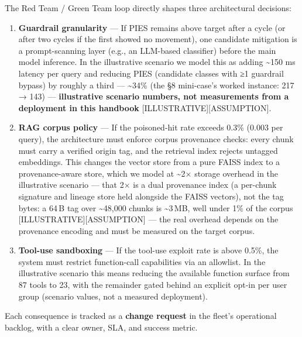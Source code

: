 \label{architecture-consequence}


The Red Team / Green Team loop directly shapes three architectural
decisions:

\begin{enumerate}
\def\labelenumi{\arabic{enumi}.}
\item
  \textbf{Guardrail granularity} --- If PIES remains above target after
  a cycle (or after two cycles if the first showed no movement), one
  candidate mitigation is a prompt-scanning layer (e.g., an LLM-based
  classifier) before the main model inference. In the illustrative
  scenario we model this as adding \textasciitilde150 ms latency per
  query and reducing PIES (candidate classes with ≥1 guardrail bypass)
  by roughly a third --- \textasciitilde34\% (the §8 mini-case's worked
  instance: 217 → 143) --- \textbf{illustrative scenario numbers, not
  measurements from a deployment in this handbook}
  \mbox{{[}ILLUSTRATIVE{]}}\hspace{0pt}\mbox{{[}ASSUMPTION{]}}.
\item
  \textbf{RAG corpus policy} --- If the poisoned-hit rate exceeds 0.3\%
  (0.003 per query), the architecture must enforce corpus provenance
  checks: every chunk must carry a verified origin tag, and the
  retrieval index rejects untagged embeddings. This changes the vector
  store from a pure FAISS index to a provenance-aware store, which we
  model at \textasciitilde2× storage overhead in the illustrative
  scenario --- that 2× is a dual provenance index (a per-chunk signature
  and lineage store held alongside the FAISS vectors), not the tag
  bytes: a 64\,B tag over \textasciitilde48,000 chunks is
  \textasciitilde3\,MB, well under 1\% of the corpus
  \mbox{{[}ILLUSTRATIVE{]}}\hspace{0pt}\mbox{{[}ASSUMPTION{]}} --- the real overhead depends on
  the provenance encoding and must be measured on the target corpus.
\item
  \textbf{Tool-use sandboxing} --- If the tool-use exploit rate is above
  0.5\%, the system must restrict function-call capabilities via an
  allowlist. In the illustrative scenario this means reducing the
  available function surface from 87 tools to 23, with the remainder
  gated behind an explicit opt-in per user group (scenario values, not a
  measured deployment).
\end{enumerate}

Each consequence is tracked as a \textbf{change request} in the fleet's
operational backlog, with a clear owner, SLA, and success metric.

